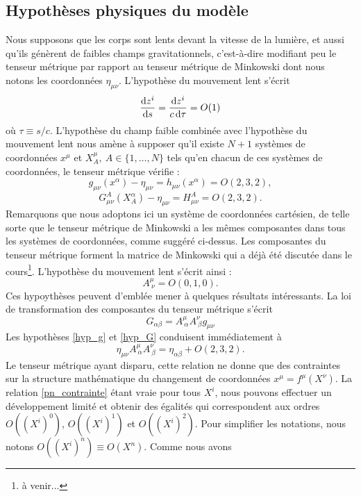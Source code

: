 		\subsection{Hypothèses physiques du modèle}
			Nous supposons que les corps sont lents devant la vitesse de la lumière, et aussi qu'ils génèrent de faibles champs gravitationnels, c'est-à-dire modifiant peu le tenseur métrique par rapport au tenseur métrique de Minkowski dont nous notons les coordonnées $\eta_{\mu\nu}$.
			L'hypothèse du mouvement lent s'écrit
			\begin{equation}
				\frac{\mathrm{d} z^i}{\mathrm{d} s} = \frac{\mathrm{d} z^i}{c \, \mathrm{d} \tau} = O(1)
			\end{equation}
			où $\tau \equiv s/c$.
			L'hypothèse du champ faible combinée avec l'hypothèse du mouvement lent nous amène à supposer qu'il existe $N+1$ systèmes de coordonnées $x^\mu$ et $X^\mu_A,\ A\in\{1,\ldots,N\}$ tels qu'en chacun de ces systèmes de coordonnées, le tenseur métrique vérifie :
			\begin{equation}\label{hyp_g}
				g_{\mu\nu}(x^\alpha)-\eta_{\mu\nu}=h_{\mu\nu}(x^\alpha)=O(2,3,2),
			\end{equation}
			\begin{equation}\label{hyp_G}
				G^A_{\mu\nu}(X^\alpha_A)-\eta_{\mu\nu}=H^A_{\mu\nu}=O(2,3,2).
			\end{equation}
			Remarquons que nous adoptons ici un système de coordonnées cartésien, de telle sorte que le tenseur métrique de Minkowski a les mêmes composantes dans tous les systèmes de coordonnées, comme suggéré ci-dessus. Les composantes du tenseur métrique forment la matrice de Minkowski qui a déjà été discutée dans le cours\footnote{à venir...}.
			L'hypothèse du mouvement lent s'écrit ainsi :
			\begin{equation}
				A^\mu_{\ \nu}=O(0,1,0). \label{hyp_v}
			\end{equation}
			Ces hypoythèses peuvent d'emblée mener à quelques résultats intéressants. La loi de transformation des composantes du tenseur métrique s'écrit
			\begin{equation}
				G_{\alpha\beta}=A^\mu_{\ \alpha}A^\nu_{\ \beta}g_{\mu\nu}
			\end{equation}
			Les hypothèses \ref{hyp_g} et \ref{hyp_G} conduisent immédiatement à 
			\begin{equation}\label{pn_contrainte}
				\eta_{\mu\nu}A^\mu_{\ \alpha}A^\nu_{\ \beta} = \eta_{\alpha\beta}+O(2,3,2).
			\end{equation}
			Le tenseur métrique ayant disparu, cette relation ne donne que des contraintes sur la structure mathématique du changement de coordonnées $x^\mu=f^\mu(X^\nu)$. La relation \ref{pn_contrainte} étant vraie pour tous $X^i$, nous pouvons effectuer un développement limité et obtenir des égalités qui correspondent aux ordres $O((X^i)^0)$, $O((X^i)^1)$ et $O((X^i)^2)$. Pour simplifier les notations, nous notons $O((X^i)^n)\equiv O(X^n)$. Comme nous avons 
